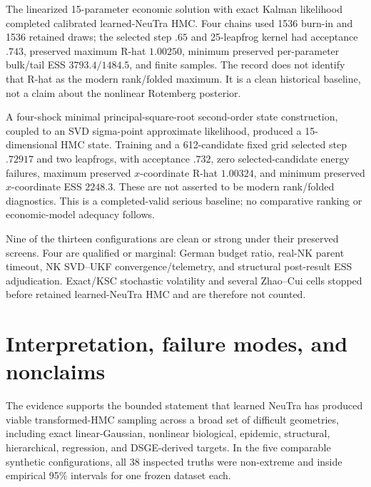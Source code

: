 \begin{description}[style=nextline]
 \item[Rotemberg NK linear-Kalman posterior.] The linearized 15-parameter
 economic solution with exact Kalman likelihood completed calibrated
 learned-NeuTra HMC.  Four chains used 1536 burn-in and 1536 retained draws;
 the selected step $.65$ and 25-leapfrog kernel had acceptance $.743$, preserved
 maximum R-hat $1.00250$, minimum preserved per-parameter bulk/tail ESS
 $3793.4/1484.5$, and finite samples.  The record does not identify that R-hat
 as the modern rank/folded maximum.
 It is a clean historical baseline, not a claim about the nonlinear Rotemberg
 posterior.

 \item[Rotemberg NK second-order SVD posterior.] A four-shock minimal
 principal-square-root second-order state construction, coupled to an SVD
 sigma-point approximate likelihood, produced a 15-dimensional HMC state.
 Training and a 612-candidate fixed grid selected step $.72917$ and two
 leapfrogs, with acceptance $.732$, zero selected-candidate energy failures,
 maximum preserved $x$-coordinate R-hat $1.00324$, and minimum preserved
 $x$-coordinate ESS $2248.3$.  These are not asserted to be modern rank/folded
 diagnostics.  This is a completed-valid
 serious baseline; no comparative ranking or economic-model adequacy follows.
\end{description}

Nine of the thirteen configurations are clean or strong under their preserved
screens.  Four are qualified or marginal: German budget ratio, real-NK parent
timeout, NK SVD--UKF convergence/telemetry, and structural post-result ESS
adjudication.  Exact/KSC stochastic volatility and several Zhao--Cui cells
stopped before retained learned-NeuTra HMC and are therefore not counted.

\section{Interpretation, failure modes, and nonclaims}

The evidence supports the bounded statement that learned NeuTra has produced
viable transformed-HMC sampling across a broad set of difficult geometries,
including exact linear-Gaussian, nonlinear biological, epidemic, structural,
hierarchical, regression, and DSGE-derived targets.  In the five comparable
synthetic configurations, all 38 inspected truths were non-extreme and inside
empirical 95\% intervals for one frozen dataset each.

